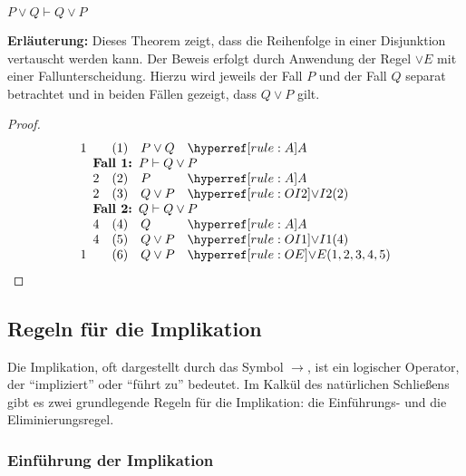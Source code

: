 \documentclass[main.tex]{subfiles}
\begin{document}
\begin{lemma}
\( P \lor Q \vdash Q \lor P \)
\end{lemma}

\textbf{Erläuterung:} Dieses Theorem zeigt, dass die Reihenfolge in einer Disjunktion vertauscht werden kann. Der Beweis erfolgt durch Anwendung der Regel \(\lor E\) mit einer Fallunterscheidung. Hierzu wird jeweils der Fall \(P\) und der Fall \(Q\) separat betrachtet und in beiden Fällen gezeigt, dass \(Q \lor P\) gilt.

\begin{proof}
\[
\begin{array}{l l l l}
    1 & (1) & P \lor Q & \rA \\
    \multicolumn{4}{l}{\quad \textbf{Fall 1: \(P\vdash Q\lor P\) } } \\
    \quad 2 & (2) & P & \rA \\
    \quad 2 & (3) & Q \lor P & \rOIb{2} \\
    \multicolumn{4}{l}{\quad \textbf{Fall 2: \(Q\vdash Q\lor P\) }} \\
    \quad 4 & (4) & Q & \rA \\
    \quad 4 & (5) & Q \lor P & \rOIa{4} \\
    1 & (6) & Q \lor P & \rOE{1,2,3,4,5} \\
\end{array}
\]
\end{proof}

\subsection{Regeln für die Implikation}

Die Implikation, oft dargestellt durch das Symbol \(\rightarrow\), ist ein logischer Operator, der \enquote{impliziert} oder \enquote{führt zu} bedeutet. Im Kalkül des natürlichen Schließens gibt es zwei grundlegende Regeln für die Implikation: die Einführungs- und die Eliminierungsregel.

\subsubsection{Einführung der Implikation}
\label{rule:RI}
\end{document}
